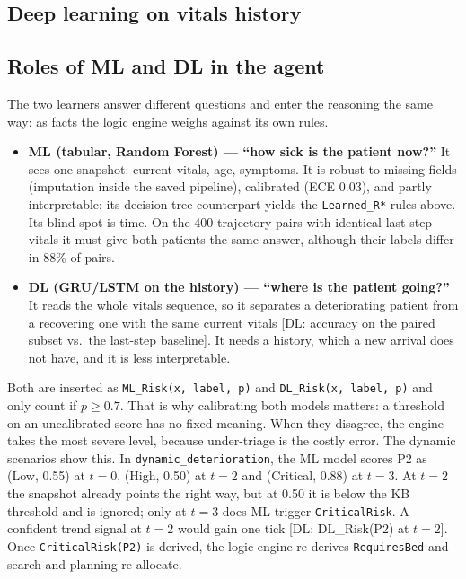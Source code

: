 \subsection{Deep learning on vitals history}

\subsection{Roles of ML and DL in the agent}

The two learners answer different questions and enter the reasoning the same way: as facts the logic engine
weighs against its own rules.

\begin{itemize}
  \item \textbf{ML (tabular, Random Forest) — ``how sick is the patient now?''} It sees one snapshot: current
  vitals, age, symptoms. It is robust to missing fields (imputation inside the saved pipeline), calibrated
  (ECE 0.03), and partly interpretable: its decision-tree counterpart yields the \texttt{Learned\_R*} rules
  above. Its blind spot is time. On the 400 trajectory pairs with identical last-step vitals it must give both
  patients the same answer, although their labels differ in 88\% of pairs.
  \item \textbf{DL (GRU/LSTM on the history) — ``where is the patient going?''} It reads the whole vitals
  sequence, so it separates a deteriorating patient from a recovering one with the same current vitals [DL:
  accuracy on the paired subset vs.\ the last-step baseline]. It needs a history, which a new arrival does
  not have, and it is less interpretable.
\end{itemize}

Both are inserted as \texttt{ML\_Risk(x, label, p)} and \texttt{DL\_Risk(x, label, p)} and only count if
$p\geq0.7$. That is why calibrating both models matters: a threshold on an uncalibrated score has no fixed
meaning. When they disagree, the engine takes the most severe level, because under-triage is the costly error.
The dynamic scenarios show this. In \texttt{dynamic\_deterioration}, the ML model scores P2 as
(Low, 0.55) at $t=0$, (High, 0.50) at $t=2$ and (Critical, 0.88) at $t=3$. At $t=2$ the snapshot already
points the right way, but at 0.50 it is below the KB threshold and is ignored; only at $t=3$ does ML trigger
\texttt{CriticalRisk}. A confident trend signal at $t=2$ would gain one tick [DL: DL\_Risk(P2) at $t=2$]. Once
\texttt{CriticalRisk(P2)} is derived, the logic engine re-derives \texttt{RequiresBed} and search and planning
re-allocate.

